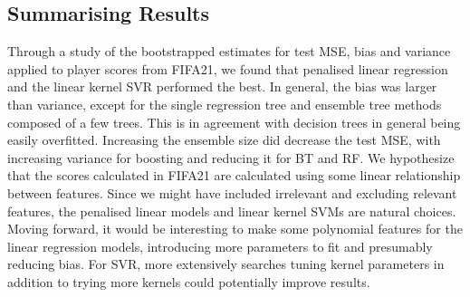         \subsection{Summarising Results}
            Through a study of the bootstrapped estimates for test MSE, bias and variance applied to player scores from FIFA21, we found that penalised linear regression and the linear kernel SVR performed the best. In general, the bias was larger than variance, except for the single regression tree and ensemble tree methods composed of a few trees. This is in agreement with decision trees in general being easily overfitted. Increasing the ensemble size did decrease the test MSE, with increasing variance for boosting and reducing it for BT and RF. We hypothesize that the scores calculated in FIFA21 are calculated using some linear relationship between features. Since we might have included irrelevant and excluding relevant features, the penalised linear models and linear kernel SVMs are natural choices. Moving forward, it would be interesting to make some polynomial features for the linear regression models, introducing more parameters to fit and presumably reducing bias. For SVR, more extensively searches tuning kernel parameters in addition to trying more kernels could potentially improve results. 